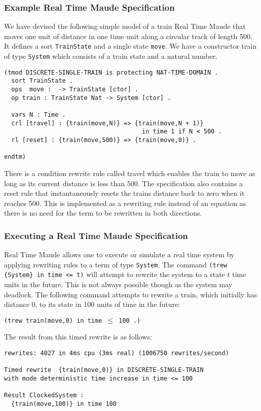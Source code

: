 \subsubsection*{Example Real Time Maude Specification}
We have devised the following simple model of a train Real Time Maude that moves one unit of distance in one time unit along a circular track of length 500. It defines a sort \texttt{TrainState} and a single state \texttt{move}. We have a constructor train of type \texttt{System} which consists of a train state and a natural number.  
\medskip
\begin{lstlisting}
(tmod DISCRETE-SINGLE-TRAIN is protecting NAT-TIME-DOMAIN .
  sort TrainState .
  ops  move :  -> TrainState [ctor] .
  op train : TrainState Nat -> System [ctor] .
 
  vars N : Time .
  crl [travel] : {train(move,N)} => {train(move,N + 1)} 
                                      in time 1 if N < 500 .
  rl [reset] : {train(move,500)} => {train(move,0)} . 
         
endtm)
\end{lstlisting}
There is a condition rewrite rule called travel which enables the train to move as long as its current distance is less than 500. The specification also contains a reset rule that instantaneously resets the trains distance back to zero when it reaches 500. This is implemented as a rewriting rule instead of an equation as there is no need for the term to be rewritten in both directions.


\subsubsection*{Executing a Real Time Maude Specification}
Real Time Maude allows one to execute or simulate a real time system by applying rewriting rules to a term of type \texttt{System}.
The command \texttt{(trew \{System\} in time <= t)} will attempt to rewrite the system to a state $t$ time units in the future. This is not always possible though as the system may deadlock. The following command attempts to rewrite a train, which initially has distance $0$, to its state in 100 units of time in the future: 
\begin{center}
\texttt{(trew {train(move,0)} in time $\leq$ 100 .)}
\end{center}

The result from this timed rewrite is as follows:
\begin{lstlisting}
rewrites: 4027 in 4ms cpu (3ms real) (1006750 rewrites/second)

Timed rewrite  {train(move,0)} in DISCRETE-SINGLE-TRAIN 
with mode deterministic time increase in time <= 100

Result ClockedSystem :
  {train(move,100)} in time 100
\end{lstlisting}

